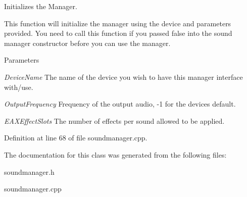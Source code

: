 Initializes the Manager. 

This function will initialize the manager using the device and parameters provided. You need to call this function if you passed false into the sound manager constructor before you can use the manager. 
\begin{DoxyParams}{Parameters}
\item[{\em DeviceName}]The name of the device you wish to have this manager interface with/use. \item[{\em OutputFrequency}]Frequency of the output audio, -\/1 for the devices default. \item[{\em EAXEffectSlots}]The number of effects per sound allowed to be applied. \end{DoxyParams}


Definition at line 68 of file soundmanager.cpp.



The documentation for this class was generated from the following files:\begin{DoxyCompactItemize}
\item 
soundmanager.h\item 
soundmanager.cpp\end{DoxyCompactItemize}
